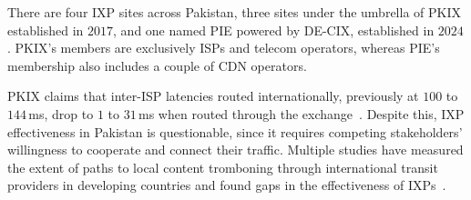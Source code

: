 \documentclass[sigconf,anonymous,10pt]{acmart}
\newcommand{\hlnew}[1]{{\sethlcolor{newhl}\hl{#1}}}
\begin{document}
There are four IXP sites across Pakistan, three sites under the umbrella of PKIX established in $2017$, and one named PIE powered by DE-CIX, established in $2024$. PKIX's members are exclusively ISPs and telecom operators, whereas PIE's membership also includes a couple of CDN operators.

PKIX claims that inter-ISP latencies routed internationally, previously at $100$ to $144$\,ms, drop to $1$ to $31$\,ms when routed through the exchange~\cite{pta2026}.
Despite this, IXP effectiveness in Pakistan is questionable, since it requires competing stakeholders' willingness to cooperate and connect their traffic.
Multiple studies have measured the extent of paths to local content tromboning through international transit providers in developing countries and found gaps in the effectiveness of IXPs~\cite{gupta2014, edmundson2016characterizing, obriain2017rebuilding}.    




\end{document}

